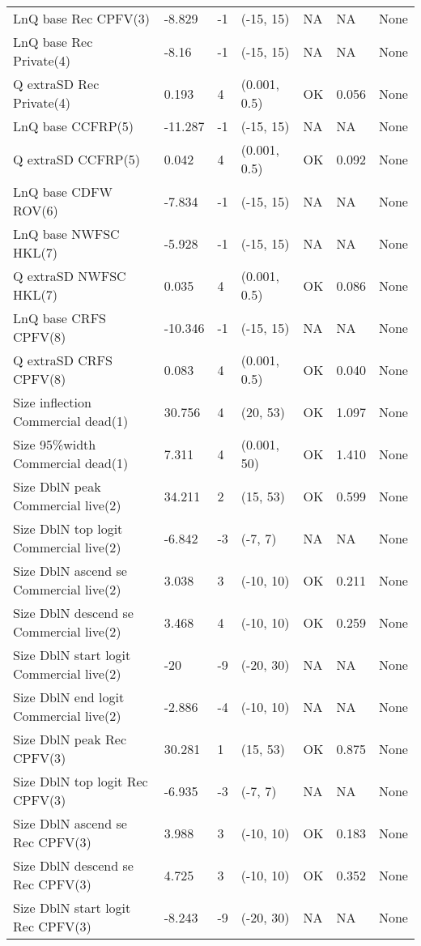 \documentclass[11pt,
  english,
  letterpaper,
]{article}
\begin{document}
\begin{landscape}
\begin{longtable}[t]{>{\raggedright\arraybackslash}p{7.5cm}lllll>{\raggedright\arraybackslash}p{3.5cm}}
LnQ base Rec CPFV(3) & -8.829 & -1 & (-15, 15) & NA & NA & None\\
LnQ base Rec Private(4) & -8.16 & -1 & (-15, 15) & NA & NA & None\\
Q extraSD Rec Private(4) & 0.193 & 4 & (0.001, 0.5) & OK & 0.056 & None\\
LnQ base CCFRP(5) & -11.287 & -1 & (-15, 15) & NA & NA & None\\
Q extraSD CCFRP(5) & 0.042 & 4 & (0.001, 0.5) & OK & 0.092 & None\\
LnQ base CDFW ROV(6) & -7.834 & -1 & (-15, 15) & NA & NA & None\\
LnQ base NWFSC HKL(7) & -5.928 & -1 & (-15, 15) & NA & NA & None\\
Q extraSD NWFSC HKL(7) & 0.035 & 4 & (0.001, 0.5) & OK & 0.086 & None\\
LnQ base CRFS CPFV(8) & -10.346 & -1 & (-15, 15) & NA & NA & None\\
Q extraSD CRFS CPFV(8) & 0.083 & 4 & (0.001, 0.5) & OK & 0.040 & None\\
Size inflection Commercial dead(1) & 30.756 & 4 & (20, 53) & OK & 1.097 & None\\
Size 95\%width Commercial dead(1) & 7.311 & 4 & (0.001, 50) & OK & 1.410 & None\\
Size DblN peak Commercial live(2) & 34.211 & 2 & (15, 53) & OK & 0.599 & None\\
Size DblN top logit Commercial live(2) & -6.842 & -3 & (-7, 7) & NA & NA & None\\
Size DblN ascend se Commercial live(2) & 3.038 & 3 & (-10, 10) & OK & 0.211 & None\\
Size DblN descend se Commercial live(2) & 3.468 & 4 & (-10, 10) & OK & 0.259 & None\\
Size DblN start logit Commercial live(2) & -20 & -9 & (-20, 30) & NA & NA & None\\
Size DblN end logit Commercial live(2) & -2.886 & -4 & (-10, 10) & NA & NA & None\\
Size DblN peak Rec CPFV(3) & 30.281 & 1 & (15, 53) & OK & 0.875 & None\\
Size DblN top logit Rec CPFV(3) & -6.935 & -3 & (-7, 7) & NA & NA & None\\
Size DblN ascend se Rec CPFV(3) & 3.988 & 3 & (-10, 10) & OK & 0.183 & None\\
Size DblN descend se Rec CPFV(3) & 4.725 & 3 & (-10, 10) & OK & 0.352 & None\\
Size DblN start logit Rec CPFV(3) & -8.243 & -9 & (-20, 30) & NA & NA & None\\

\end{longtable}
\end{landscape}
\end{document}

